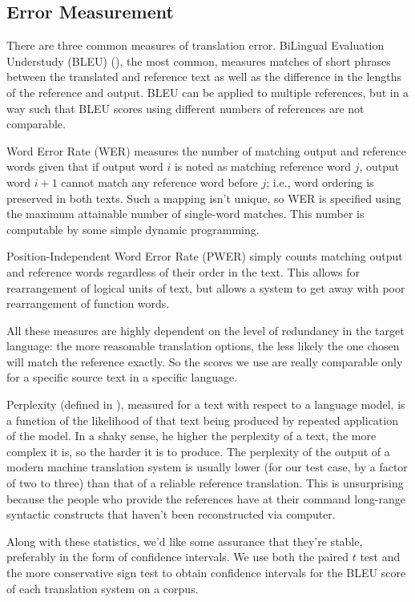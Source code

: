 \documentclass[11pt]{report}
\theoremstyle{plain}
\begin{document}
{\subsection{Error Measurement}
There are three common measures of translation error. BiLingual Evaluation Understudy (BLEU) (\cite{bleu}), the most common, measures matches of short phrases between the translated and reference text as well as the difference in the lengths of the reference and output. BLEU can be applied to multiple references, but in a way such that BLEU scores using different numbers of references are not comparable.

Word Error Rate (WER) measures the number of matching output and reference words given that if output word $i$ is noted as matching reference word $j$, output word $i + 1$ cannot match any reference word before $j$; i.e., word ordering is preserved in both texts. Such a mapping isn't unique, so WER is specified using the maximum attainable number of single-word matches. This number is computable by some simple dynamic programming.

Position-Independent Word Error Rate (PWER) simply counts matching output and reference words regardless of their order in the text. This allows for rearrangement of logical units of text, but allows a system to get away with poor rearrangement of function words.

All these measures are highly dependent on the level of redundancy in the target language: the more reasonable translation options, the less likely the one chosen will match the reference exactly. So the scores we use are really comparable only for a specific source text in a specific language.

Perplexity (defined in \cite{perplexity}), measured for a text with respect to a language model, is a function of the likelihood of that text being produced by repeated application of the model. In a shaky sense, he higher the perplexity of a text, the more complex it is, so the harder it is to produce. The perplexity of the output of a modern machine translation system is usually lower (for our test case, by a factor of two to three) than that of a reliable reference translation. This is unsurprising because the people who provide the references have at their command long-range syntactic constructs that haven't been reconstructed via computer.

Along with these statistics, we'd like some assurance that they're stable, preferably in the form of confidence intervals. We use both the paired $t$ test and the more conservative sign test to obtain confidence intervals for the BLEU score of each translation system on a corpus.

}
\end{document}
